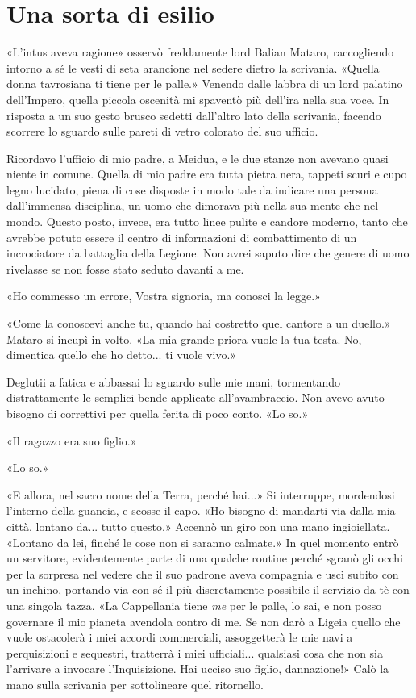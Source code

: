 \chapter{Una sorta di esilio}

«L'intus aveva ragione» osservò freddamente lord Balian Mataro,
raccogliendo intorno a sé le vesti di seta arancione nel sedere dietro
la scrivania. «Quella donna tavrosiana ti tiene per le palle.» Venendo
dalle labbra di un lord palatino dell'Impero, quella piccola oscenità mi
spaventò più dell'ira nella sua voce. In risposta a un suo gesto brusco
sedetti dall'altro lato della scrivania, facendo scorrere lo sguardo
sulle pareti di vetro colorato del suo ufficio.

Ricordavo l'ufficio di mio padre, a Meidua, e le due stanze non avevano
quasi niente in comune. Quella di mio padre era tutta pietra nera,
tappeti scuri e cupo legno lucidato, piena di cose disposte in modo tale
da indicare una persona dall'immensa disciplina, un uomo che dimorava
più nella sua mente che nel mondo. Questo posto, invece, era tutto linee
pulite e candore moderno, tanto che avrebbe potuto essere il centro di
informazioni di combattimento di un incrociatore da battaglia della
Legione. Non avrei saputo dire che genere di uomo rivelasse se non fosse
stato seduto davanti a me.

«Ho commesso un errore, Vostra signoria, ma conosci la legge.»

«Come la conoscevi anche tu, quando hai costretto quel cantore a un
duello.» Mataro si incupì in volto. «La mia grande priora vuole la tua
testa. No, dimentica quello che ho detto... ti vuole vivo.»

Deglutii a fatica e abbassai lo sguardo sulle mie mani, tormentando
distrattamente le semplici bende applicate all'avambraccio. Non avevo
avuto bisogno di correttivi per quella ferita di poco conto. «Lo so.»

«Il ragazzo era suo figlio.»

«Lo so.»

«E allora, nel sacro nome della Terra, perché hai...» Si interruppe,
mordendosi l'interno della guancia, e scosse il capo. «Ho bisogno di
mandarti via dalla mia città, lontano da... tutto questo.» Accennò un
giro con una mano ingioiellata. «Lontano da lei, finché le cose non si
saranno calmate.» In quel momento entrò un servitore, evidentemente
parte di una qualche routine perché sgranò gli occhi per la sorpresa nel
vedere che il suo padrone aveva compagnia e uscì subito con un inchino,
portando via con sé il più discretamente possibile il servizio da tè con
una singola tazza. «La Cappellania tiene \emph{me} per le palle, lo sai,
e non posso governare il mio pianeta avendola contro di me. Se non darò
a Ligeia quello che vuole ostacolerà i miei accordi commerciali,
assoggetterà le mie navi a perquisizioni e sequestri, tratterrà i miei
ufficiali... qualsiasi cosa che non sia l'arrivare a invocare
l'Inquisizione. Hai ucciso suo figlio, dannazione!» Calò la mano sulla
scrivania per sottolineare quel ritornello.

